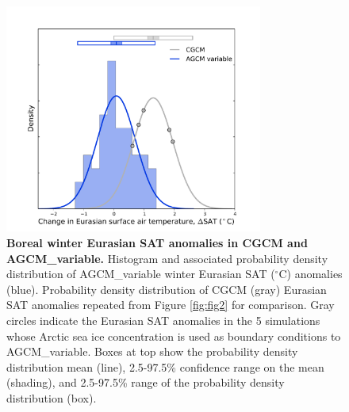 \documentclass{nature}
\begin{document}
\begin{figure}%
\centering
\noindent\includegraphics[width=20pc]{Word/Figure_3.pdf}
\caption{\textbf{Boreal winter Eurasian SAT anomalies in CGCM and AGCM\_variable.} Histogram and associated probability density distribution of AGCM\_variable winter Eurasian SAT ($^\circ$C) anomalies (blue). Probability density distribution of CGCM (gray) Eurasian SAT anomalies repeated from Figure \ref{fig:fig2} for comparison. Gray circles indicate the Eurasian SAT anomalies in the 5 simulations whose Arctic sea ice concentration is used as boundary conditions to AGCM\_variable. Boxes at top show the probability density distribution mean (line), 2.5-97.5\% confidence range on the mean (shading), and 2.5-97.5\% range of the probability density distribution (box).
} %
\label{fig:fig3} 
\end{figure}
\end{document}
